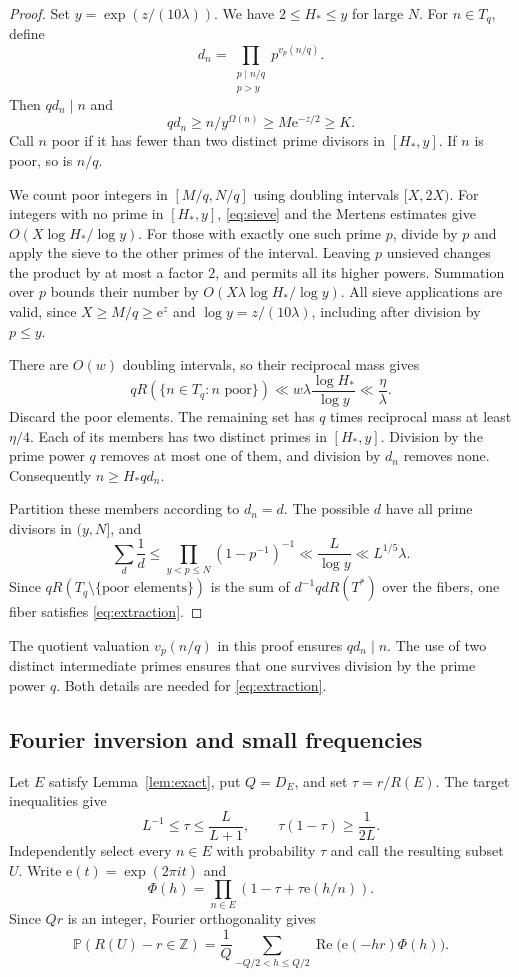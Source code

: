 \documentclass[11pt,leqno]{amsart}
\numberwithin{equation}{section}
\theoremstyle{definition}
\theoremstyle{remark}
\newcommand{\Z}{\mathbb Z}
\newcommand{\e}{\mathrm e}
\begin{document}
\begin{proof}
Set $y=\exp(z/(10\lambda))$. We have $2\le H_*\le y$ for large $N$.
For $n\in T_q$, define
\[
 d_n=\prod_{\substack{p\mid n/q\\p>y}}p^{v_p(n/q)}.
\]
Then $qd_n\mid n$ and
\[
 qd_n\ge n/y^{\Omega(n)}\ge M\e^{-z/2}\ge K.
\]
Call $n$ poor if it has fewer than two distinct prime divisors in
$[H_*,y]$. If $n$ is poor, so is $n/q$.

We count poor integers in $[M/q,N/q]$ using doubling intervals
$[X,2X)$. For integers with no prime in $[H_*,y]$,
\eqref{eq:sieve} and the Mertens estimates give
$O(X\log H_*/\log y)$.
For those with exactly one such prime $p$, divide by $p$ and apply the
sieve to the other primes of the interval. Leaving $p$ unsieved changes
the product by at most a factor $2$, and permits all its higher powers.
Summation over $p$ bounds their number by
$O(X\lambda\log H_*/\log y)$.
All sieve applications are valid, since $X\ge M/q\ge\e^z$ and
$\log y=z/(10\lambda)$, including after division by $p\le y$.

There are $O(w)$ doubling intervals, so their reciprocal mass gives
\[
 qR(\{n\in T_q:n\text{ poor}\})
 \ll w\lambda\frac{\log H_*}{\log y}
 \ll\frac\eta\lambda.
\]
Discard the poor elements. The remaining set has $q$ times reciprocal
mass at least $\eta/4$. Each of its members has two distinct primes in
$[H_*,y]$. Division by the prime power $q$ removes at most one of them,
and division by $d_n$ removes none. Consequently $n\ge H_*qd_n$.

Partition these members according to $d_n=d$. The possible $d$ have all
prime divisors in $(y,N]$, and
\[
 \sum_d\frac1d\le\prod_{y<p\le N}(1-p^{-1})^{-1}
 \ll\frac L{\log y}\ll L^{1/5}\lambda.
\]
Since $qR(T_q\setminus\{\text{poor elements}\})$
is the sum of $d^{-1}qdR(T^*)$ over the fibers, one fiber satisfies
\eqref{eq:extraction}.
\end{proof}

The quotient valuation $v_p(n/q)$ in this proof ensures $qd_n\mid n$.
The use of two distinct intermediate primes ensures that one survives
division by the prime power $q$. Both details are needed for
\eqref{eq:extraction}.

\subsection{Fourier inversion and small frequencies}

Let $E$ satisfy Lemma~\ref{lem:exact}, put $Q=D_E$, and set
$\tau=r/R(E)$. The target inequalities give
\[
 L^{-1}\le\tau\le\frac L{L+1},\qquad
 \tau(1-\tau)\ge\frac1{2L}.
\]
Independently select every $n\in E$ with probability $\tau$ and call
the resulting subset $U$. Write $\mathrm e(t)=\exp(2\pi it)$ and
\[
 \Phi(h)=\prod_{n\in E}(1-\tau+\tau\mathrm e(h/n)).
\]
Since $Qr$ is an integer, Fourier orthogonality gives
\begin{equation}\label{eq:Fourierprob}
 \mathbb P(R(U)-r\in\Z)
 =\frac1Q\sum_{-Q/2<h\le Q/2}
       \operatorname{Re}\bigl(\mathrm e(-hr)\Phi(h)\bigr).
\end{equation}
\end{document}
